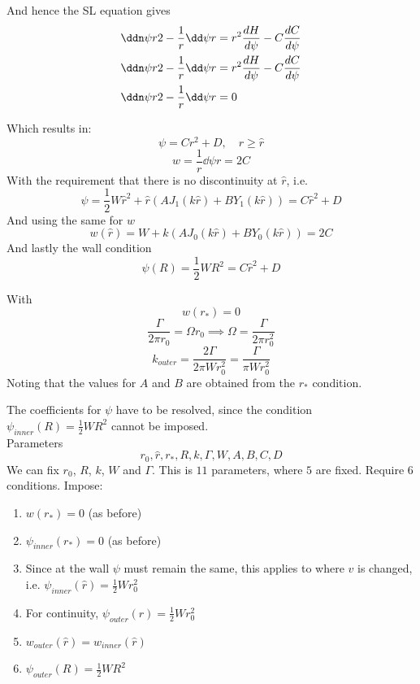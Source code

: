\documentclass{X:/Documents/Coding/Latex/myreport}
\begin{document}
And hence the SL equation gives
\begin{align*}
 \ddn \psi r 2 - \frac1r \dd\psi r &= r^2 \frac{dH}{d\psi} - C \frac{dC}{d\psi}\\
 \ddn \psi r 2 - \frac1r \dd\psi r &= r^2 \frac{dH}{d\psi} - C \frac{dC}{d\psi}\\
\ddn \psi r 2 - \frac1r \dd\psi r &=0\\
\end{align*}

Which results in:
\[\psi = Cr^2 + D, \quad r \geq \hat{r}\]
\[w = \frac1r \dd\psi r = 2C\]
With the requirement that there is no discontinuity at $\hat{r}$, i.e.
\[\psi = \frac12 W\hat{r}^2 + \hat{r}\left(AJ_1(k \hat{r}) + BY_1(k\hat{r})\right) = C\hat{r}^2 + D\]
And using the same for $w$
\[w(\hat{r}) = W + k(AJ_0(k\hat{r}) + BY_0(k\hat{r})) = 2C\]
And lastly the wall condition
\[\psi(R) = \frac12 W R^2 = C\hat{r}^2 +D\]

With
\[w(r_*) = 0\]
\[\frac{\Gamma}{2\pi r_0} = \Omega r_0 \implies \Omega = \frac{\Gamma}{2\pi r_0^2} \]
\[k_{outer} = \frac{2\Gamma}{2\pi W r_0^2} = \frac{\Gamma}{\pi W r_0^2}  \]
Noting that the values for $A$ and $B$ are obtained from the $r_*$ condition.



The coefficients for $\psi$ have to be resolved, since the condition $\psi_{inner}(R) = \frac12 WR^2$ cannot be imposed.\\

Parameters
\[r_0,\hat{r}, r_*, R,k, \Gamma, W, A,B,C,D\]
We can fix $r_0$, $R$, $k$, $W$ and $\Gamma$.
This is $11$ parameters, where $5$ are fixed. Require $6$ conditions.
Impose:

\renewcommand{\theenumi}{\arabic{enumi})}    
\begin{enumerate}
    \item \label{rankine::1}$w(r_*) = 0$ (as before)
    \item \label{rankine::2} $\psi_{inner}(r_*) = 0$ (as before)
    \item\label{rankine::3} Since at the wall $\psi$ must remain the same, this applies to where $v$ is changed, i.e. $\psi_{inner}(\hat{r}) = \frac12 W r_0^2$ 
    \item\label{rankine::4} For continuity, $\psi_{outer}(\hat{r}) = \frac12 W r_0^2$ 
    \item\label{rankine::5} $w_{outer}(\hat{r}) = w_{inner}(\hat{r})$\\
    \item\label{rankine::6} $\psi_{outer}(R) = \frac12 WR^2$ 
\end{enumerate}
\end{document}
